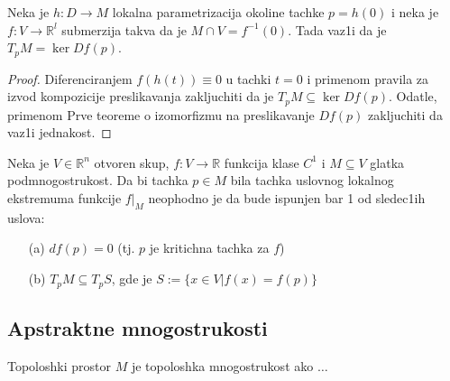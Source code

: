 \documentclass[a4paper,12pt]{article}
\newcommand{\R}{\mathbb{R}}
\newcommand{\psj}{\subseteq}
\begin{document}
\begin{tvr}
Neka je $h:D \to M$ lokalna parametrizacija okoline tachke $p = h(0)$ i neka je $f: V \to \R^l$ submerzija takva da je $M \cap V = f^{-1} (0)$. Tada vaz1i da je $T_p M = \ker D f(p)$.
\end{tvr}
\begin{proof}
Diferenciranjem $f(h(t)) \equiv 0$ u tachki $t = 0$ i primenom pravila za izvod kom\-po\-zi\-ci\-je preslikavanja zakljuchiti da je $T_p M \psj \ker Df(p)$. Odatle, primenom Prve teoreme o i\-zo\-mor\-fi\-zmu na preslikavanje $Df(p)$ zakljuchiti da vaz1i jednakost.
\end{proof}

\begin{tma}
Neka je $V \in \R^n$ otvoren skup, $f: V \to \R$ funkcija klase $C^1$ i $M \psj V$ glatka podmnogostrukost. Da bi tachka $p \in M$ bila tachka uslovnog lokalnog ekstremuma funkcije $f|_M$ neophodno je da bude ispunjen bar 1 od sledec1ih uslova:
\begin{itemize}
\item[(a)] $df(p) = 0$ (tj. $p$ je kritichna tachka za $f$)
\item[(b)] $T_pM \psj T_pS$, gde je $S:= \{x \in V | f(x) = f(p) \}$
\end{itemize}
\end{tma}

\subsection{Apstraktne mnogostrukosti}

Topoloshki prostor $M$ je topoloshka mnogostrukost ako $\dotso$
\end{document}
